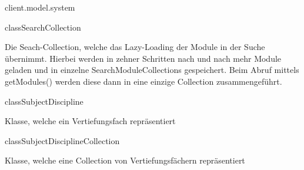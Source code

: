 \begin{texdocpackage}{client.model.system}
\begin{texdocclass}{class}{SearchCollection}
\label{texdoclet:edu.kit.informatik.studyplan.client.model.system.SearchCollection}
\begin{texdocclassintro}
Die Seach-Collection, welche das Lazy-Loading der Module in der Suche
 übernimmt. Hierbei werden in zehner Schritten nach und nach mehr Module
 geladen und in einzelne SearchModuleCollections gespeichert. Beim Abruf
 mittels getModules() werden diese dann in eine einzige Collection
 zusammengeführt.\end{texdocclassintro}
\begin{texdocclassconstructors}
\end{texdocclassconstructors}
\begin{texdocclassmethods}
\end{texdocclassmethods}
\end{texdocclass}


\begin{texdocclass}{class}{SubjectDiscipline}
\label{texdoclet:edu.kit.informatik.studyplan.client.model.system.SubjectDiscipline}
\begin{texdocclassintro}
Klasse, welche ein Vertiefungsfach repräsentiert\end{texdocclassintro}
\begin{texdocclassconstructors}
\end{texdocclassconstructors}
\end{texdocclass}


\begin{texdocclass}{class}{SubjectDisciplineCollection}
\label{texdoclet:edu.kit.informatik.studyplan.client.model.system.SubjectDisciplineCollection}
\begin{texdocclassintro}
Klasse, welche eine Collection von Vertiefungsfächern repräsentiert\end{texdocclassintro}
\begin{texdocclassconstructors}
\end{texdocclassconstructors}
\end{texdocclass}



\end{texdocpackage}
